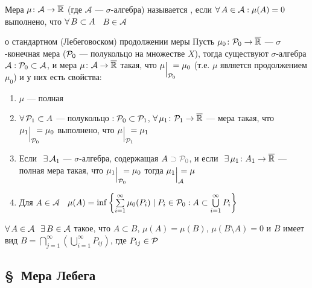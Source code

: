 \begin{opr}\label{полная мера}
	Мера $\mu \colon \mathcal{A} \to \overline{\mathbb R}$ (где $\mathcal{A}$ --- $\sigma$-алгебра) называется , если $\forall \, A \in \mathcal{A} : \mu(A) = 0$ выполнено, что $\forall \, B \subset A$ \ $B \in \mathcal{A}$ 
\end{opr}
\pagebreak
\begin{teor}[https://www.youtube.com/live/Ptfcl76lZBs?si=5tjUKh1UlMak8EGx&t=10579]{о стандартном (Лебеговоском) продолжении меры}\label{прод.меры}%
	Пусть $\mu_0 \colon \mathcal{P}_0 \to \overline {\mathbb R}$ --- $\sigma$-конечная мера ($\mathcal{P}_0$ --- полукольцо на множестве $X$), тогда существуют $\sigma$-алгебра $\mathcal A : \mathcal{P}_0 \subset \mathcal A$, и мера $\mu \colon \mathcal A \to \overline {\mathbb R}$ такая, что $\mu \raisebox{0pt}[0pt][0pt]{\su{\p_0}} = \mu_0$ (т.е. $\mu$ является продолжением $\mu_0$) и у них есть свойства:
	\begin{enumerate}
		\item $\mu$ --- полная
		
		\item $\forall \, \mathcal{P}_1 \subset A$ --- полукольцо${}: \mathcal{P}_0 \subset \mathcal{P}_1$, $\forall \, \mu_1 \colon \mathcal{P}_1 \to \overline{\mathbb R}$ --- мера такая, что $\mu_1 \su{\p_0} = \mu_0$ выполнено, что $\mu\su{\p_1} = \mu_1$ 
		
		\item Если$\E \mathcal A_1$ --- $\sigma$-алгебра, содержащая $A\uns{{}\supset \p_0}$, и если$\E \mu_1 \colon A_1 \to \overline \rr$ --- полная мера такая, что $\mu_1\su{\p_0} = \mu_0$ тогда $\mu_1\su{\mathcal A} = \mu$
		
		\item\label{форм.меры} Для $A \in \mathcal{A}$ \ $\mu(A) = \inf\left\{\sum\limits_{i = 1}^\infty \mu_0 (P_i) \mid P_i \in \mathcal{P}_0 : A \subset \bigcup\limits_{i = 1}^\infty P_i \right\} $
	\end{enumerate}
\end{teor}

\begin{zam}[https://www.youtube.com/live/Ptfcl76lZBs?si=0IEfoZ4GCXaVGxNG&t=11380]
	$\A A \in \mathcal A \E B \in \mathcal{A}$ такое, что $A \subset B$, $\mu(A) = \mu(B)$, $\mu(B \setminus A) = 0$ и $B$ имеет вид $B = \bigcap\limits_{j = 1}^\infty \left( \bigcup\limits_{i = 1}^\infty P_{ij}\right)$, где $P_{ij} \in \mathcal{P}$
\end{zam}

\subsection*{\S\ Мера Лебега}

